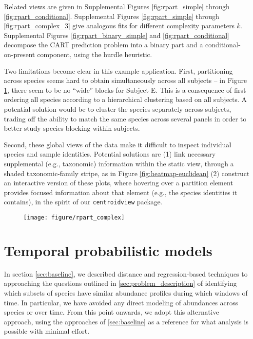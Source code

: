\documentclass[14pt]{extreport}
\begin{document}
Related views are given in Supplemental Figures \ref{fig:rpart_simple} through
\ref{fig:rpart_conditional}. Supplemental Figures \ref {fig:rpart_simple}
through \ref{fig:rpart_complex_3} give analogous fits for different complexity
parameters $k$. Supplemental Figures \ref{fig:rpart_binary_simple} and
\ref{fig:rpart_conditional} decompose the CART prediction problem into a binary
part and a conditional-on-present component, using the hurdle heuristic.

Two limitations become clear in this example application. First, partitioning
across species seems hard to obtain simultaneously across all subjects -- in
Figure \ref{fig:rpart_complex}, there seem to be no ``wide'' blocks for Subject
E. This is a consequence of first ordering all species according to a
hierarchical clustering based on all subjects. A potential solution would be to
cluster the species separately across subjects, trading off the ability to match
the same species across several panels in order to better study species blocking
within subjects.

Second, these global views of the data make it difficult to inspect individual
species and sample identities. Potential solutions are (1) link necessary
supplemental (e.g., taxonomic) information within the static view, through a
shaded taxonomic-family stripe, as in Figure \ref{fig:heatmap-euclidean} (2)
construct an interactive version of these plots, where hovering over a partition
element provides focused information about that element (e.g., the species
identities it contains), in the spirit of our \texttt{centroidview} package.

\begin{figure}
  \centering
  \texttt{[image: figure/rpart\_complex]}
  \caption{\label{fig:rpart_complex} }
\end{figure}

\section{Temporal probabilistic models}
\label{sec:temporal_probabilistic_models}

In section \ref{sec:baseline}, we described distance and regression-based
techniques to approaching the questions outlined in
\ref{sec:problem_description} of identifying which subsets of species have
similar abundance profiles during which windows of time. In particular, we have
avoided any direct modeling of abundances across species or over time. From this
point onwards, we adopt this alternative approach, using the approaches of
\ref{sec:baseline} as a reference for what analysis is possible with minimal
effort.
\end{document}
